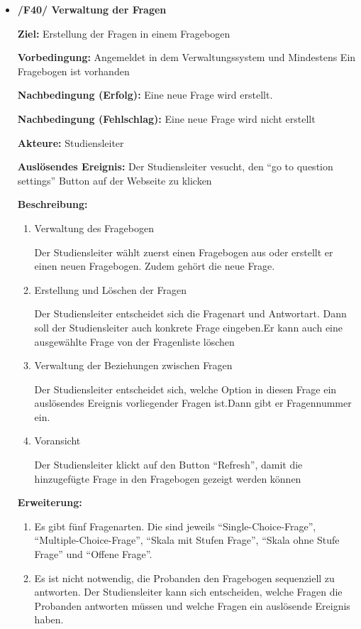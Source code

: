 \documentclass[a4paper]{scrreprt}
\begin{document}
\begin{itemize}
                \item \textbf{/F40/ Verwaltung der Fragen }
                \par \textbf{Ziel: }Erstellung der Fragen in einem Fragebogen
                \par \textbf{Vorbedingung: } Angemeldet in dem Verwaltungssystem und Mindestens Ein Fragebogen ist vorhanden
                \par \textbf{Nachbedingung (Erfolg): }Eine neue Frage wird erstellt.
                \par \textbf{Nachbedingung (Fehlschlag): }Eine neue Frage wird nicht erstellt
                \par \textbf{Akteure: }\gls{Studiensleiter}
                \par \textbf{Auslösendes Ereignis: }Der \gls{Studiensleiter} vesucht, den ``go to question settings'' Button auf der Webseite zu klicken
                \par \textbf{Beschreibung: }
                \begin{enumerate}
                    \item Verwaltung des Fragebogen
                    \par Der \gls{Studiensleiter} wählt zuerst einen Fragebogen aus oder erstellt er einen neuen Fragebogen. Zudem gehört die neue Frage.
                    \item Erstellung und Löschen der Fragen
                    \par Der \gls{Studiensleiter} entscheidet sich die Fragenart und Antwortart. Dann soll der \gls{Studiensleiter} auch konkrete Frage eingeben.Er kann auch eine ausgewählte Frage von der Fragenliste löschen
                    \item Verwaltung der Beziehungen zwischen Fragen
                    \par Der \gls{Studiensleiter} entscheidet sich, welche Option in diesen Frage ein auslösendes Ereignis vorliegender Fragen ist.Dann gibt er Fragennummer ein.
                    \item Voransicht
                    \par Der \gls{Studiensleiter} klickt auf den Button ``Refresh'', damit die hinzugefügte Frage in den Fragebogen gezeigt werden können
                \end{enumerate}
                \par \textbf{Erweiterung: }
                \begin{enumerate}
                    \item Es gibt fünf Fragenarten. Die sind jeweils ``Single-Choice-Frage'', ``Multiple-Choice-Frage'', ``Skala mit Stufen Frage'', ``Skala ohne Stufe Frage'' und ``Offene Frage''.
                    \item Es ist nicht notwendig, die \gls{Proband}en den Fragebogen sequenziell zu antworten. Der \gls{Studiensleiter} kann sich entscheiden, welche Fragen die \gls{Proband}en antworten müssen und welche Fragen ein auslösende Ereignis haben.
                \end{enumerate}



\end{itemize}
\end{document}
